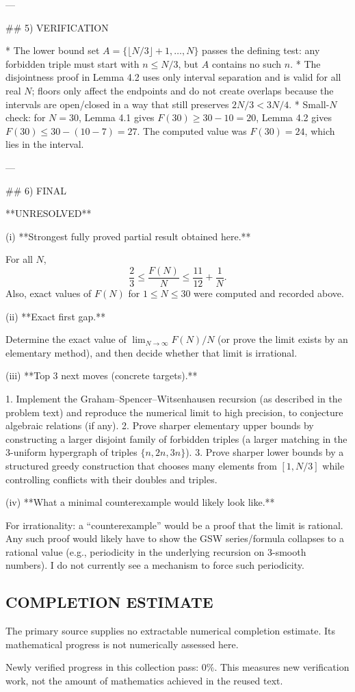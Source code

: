 ---

## 5) VERIFICATION

* The lower bound set $A=\{\lfloor N/3\rfloor+1,\dots,N\}$ passes the defining test: any forbidden triple must start with $n\le N/3$, but $A$ contains no such $n$.
* The disjointness proof in Lemma 4.2 uses only interval separation and is valid for all real $N$; floors only affect the endpoints and do not create overlaps because the intervals are open/closed in a way that still preserves $2N/3<3N/4$.
* Small-$N$ check: for $N=30$, Lemma 4.1 gives $F(30)\ge 30-10=20$, Lemma 4.2 gives $F(30)\le 30-(10-7)=27$. The computed value was $F(30)=24$, which lies in the interval.

---

## 6) FINAL

**UNRESOLVED**

(i) **Strongest fully proved partial result obtained here.**

For all $N$,
\[
\frac{2}{3}\le \frac{F(N)}{N}\le \frac{11}{12}+\frac{1}{N}.
\]
Also, exact values of $F(N)$ for $1\le N\le 30$ were computed and recorded above.

(ii) **Exact first gap.**

Determine the exact value of $\displaystyle \lim_{N\to\infty} F(N)/N$ (or prove the limit exists by an elementary method), and then decide whether that limit is irrational.

(iii) **Top 3 next moves (concrete targets).**

1. Implement the Graham–Spencer–Witsenhausen recursion (as described in the problem text) and reproduce the numerical limit to high precision, to conjecture algebraic relations (if any).
2. Prove sharper elementary upper bounds by constructing a larger disjoint family of forbidden triples (a larger matching in the 3-uniform hypergraph of triples $\{n,2n,3n\}$).
3. Prove sharper lower bounds by a structured greedy construction that chooses many elements from $[1,N/3]$ while controlling conflicts with their doubles and triples.

(iv) **What a minimal counterexample would likely look like.**

For irrationality: a “counterexample” would be a proof that the limit is rational. Any such proof would likely have to show the GSW series/formula collapses to a rational value (e.g., periodicity in the underlying recursion on $3$-smooth numbers). I do not currently see a mechanism to force such periodicity.




\subsection*{COMPLETION ESTIMATE}
The primary source supplies no extractable numerical completion estimate. Its mathematical progress is not numerically assessed here.

Newly verified progress in this collection pass: $0\%$. This measures new verification work, not the amount of mathematics achieved in the reused text.
